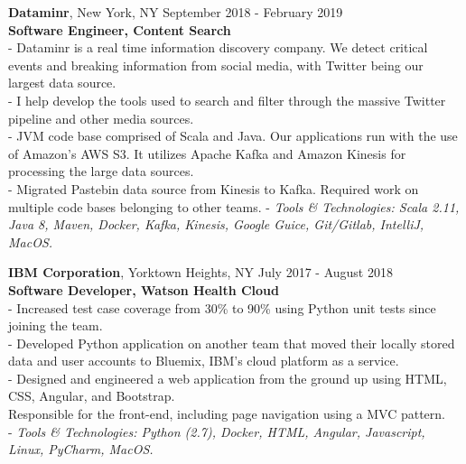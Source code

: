 \documentclass{resume}
\begin{document}
\begin{flushleft}
\textbf{Dataminr}, New York, NY \hfill September 2018 - February 2019\\
\textbf{Software Engineer, Content Search}\\
{\footnotesize
\ttab - Dataminr is a real time information discovery company. We detect critical events and breaking information from social \ttab media, with Twitter being our largest data source. \\
\ttab - I help develop the tools used to search and filter through the massive Twitter pipeline and other media sources. \\
\ttab - JVM code base comprised of Scala and Java. Our applications run with the use of Amazon's AWS S3. It utilizes Apache \ttab Kafka and Amazon Kinesis for processing the large data sources.\\
\ttab - Migrated Pastebin data source from Kinesis to Kafka. Required work on multiple code bases belonging to other teams.
\ttab- \textit{Tools \& Technologies: Scala 2.11, Java 8, Maven, Docker, Kafka, Kinesis, Google Guice, Git/Gitlab, IntelliJ, MacOS.}\\[3mm]
}

\textbf{IBM Corporation}, Yorktown Heights, NY \hfill July 2017 - August 2018\\
\textbf{Software Developer, Watson Health Cloud}\\
{\footnotesize
	\ttab- Increased test case coverage from 30\% to 90\% using Python unit tests since joining the team. \\
	\ttab- Developed Python application on another team that moved their locally stored data and user accounts to Bluemix,
	\ttab IBM's cloud platform as a service. \\
	\ttab- Designed and engineered a web application from the ground up using HTML, CSS, Angular, and Bootstrap. \\
	\ttab Responsible for the front-end, including page navigation using a MVC pattern. \\
	\ttab- \textit{Tools \& Technologies: Python (2.7), Docker, HTML, Angular, Javascript, Linux, PyCharm, MacOS.}\\[3mm]
}


\end{flushleft}
\end{document}
